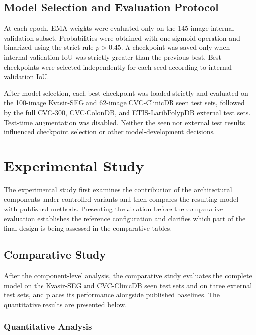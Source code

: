 \subsection{Model Selection and Evaluation Protocol}
\label{model-selection}

At each epoch, EMA weights were evaluated only on the 145-image internal
validation subset. Probabilities were obtained with one sigmoid operation and
binarized using the strict rule $p>0.45$. A checkpoint was saved only when
internal-validation IoU was strictly greater than the previous best. Best
checkpoints were selected independently for each seed according to
internal-validation IoU.

After model selection, each best checkpoint was loaded strictly and evaluated on the
100-image Kvasir-SEG and 62-image CVC-ClinicDB seen test sets, followed by the full
CVC-300, CVC-ColonDB, and ETIS-LaribPolypDB external test sets. Test-time
augmentation was disabled. Neither the seen nor external test results influenced
checkpoint selection or other model-development decisions.

\section{Experimental Study}\label{experimental-study}

The experimental study first examines the contribution of the architectural components
under controlled variants and then compares the resulting model with published methods.
Presenting the ablation before the comparative evaluation establishes the reference
configuration and clarifies which part of the final design is being assessed in the
comparative tables.



\subsection{Comparative Study}\label{comparative-study}

After the component-level analysis, the comparative study evaluates the complete model
on the Kvasir-SEG and CVC-ClinicDB seen test sets and on three external test sets,
and places its performance alongside published baselines. The quantitative results
are presented below.

\subsubsection{Quantitative Analysis}\label{quantitative-analysis}

